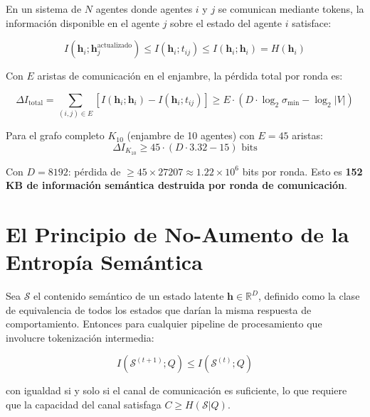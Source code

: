 En un sistema de $N$ agentes donde agentes $i$ y $j$ se comunican mediante
tokens, la información disponible en el agente $j$ sobre el estado del agente $i$
satisface:

\begin{equation}
I(\mathbf{h}_i; \mathbf{h}_j^{\text{actualizado}}) \le I(\mathbf{h}_i; t_{ij}) \le I(\mathbf{h}_i; \mathbf{h}_i) = H(\mathbf{h}_i)
\end{equation}

Con $E$ aristas de comunicación en el enjambre, la pérdida total por ronda es:

\begin{equation}
\Delta I_{\text{total}} = \sum_{(i,j) \in E} \left[I(\mathbf{h}_i; \mathbf{h}_i) - I(\mathbf{h}_i; t_{ij})\right]
\ge E \cdot (D \cdot \log_2 \sigma_{\min} - \log_2 |V|)
\end{equation}

Para el grafo completo $K_{10}$ (enjambre de 10 agentes) con $E = 45$ aristas:
\begin{equation}
\Delta I_{K_{10}} \ge 45 \cdot (D \cdot 3.32 - 15) \text{ bits}
\end{equation}

Con $D = 8192$: pérdida de $\ge 45 \times 27207 \approx 1.22 \times 10^6$ bits por ronda.
Esto es \textbf{152 KB de información semántica destruida por ronda de comunicación}.

\section{El Principio de No-Aumento de la Entropía Semántica}

\begin{theorem}

Sea $\mathcal{S}$ el contenido semántico de un estado latente $\mathbf{h} \in \mathbb{R}^D$,
definido como la clase de equivalencia de todos los estados que darían la misma
respuesta de comportamiento. Entonces para cualquier pipeline de procesamiento
que involucre tokenización intermedia:

\begin{equation}
I(\mathcal{S}^{(t+1)}; Q) \le I(\mathcal{S}^{(t)}; Q)
\end{equation}

con igualdad si y solo si el canal de comunicación es suficiente, lo que requiere
que la capacidad del canal satisfaga $C \ge H(\mathcal{S} | Q)$.
\end{theorem}

